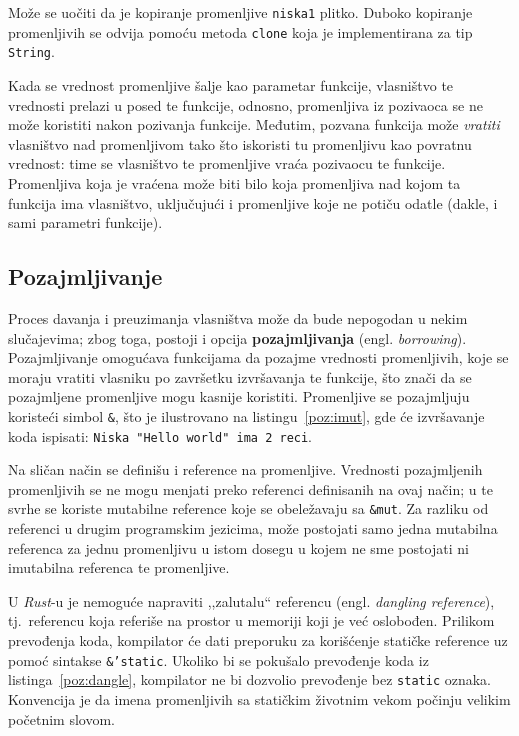 \documentclass[12pt,oneside]{memoir}
\begin{document}
Može se uočiti da je kopiranje promenljive \texttt{niska1} plitko. Duboko kopiranje promenljivih
se odvija pomoću metoda \texttt{clone} koja je implementirana za tip \texttt{String}.


Kada se vrednost promenljive šalje kao parametar funkcije, vlasništvo te vrednosti prelazi
u posed te funkcije, odnosno, promenljiva iz pozivaoca se ne može koristiti nakon pozivanja funkcije.
Međutim, pozvana funkcija može \emph{vratiti} vlasništvo nad promenljivom tako što iskoristi tu
promenljivu kao povratnu vrednost: time se vlasništvo te promenljive vraća pozivaocu te funkcije.
Promenljiva koja je vraćena može biti bilo koja promenljiva nad kojom ta funkcija ima vlasništvo,
uključujući i promenljive koje ne potiču odatle (dakle, i sami parametri funkcije).

\subsection{Pozajmljivanje}\label{subsec:pozajmljivanje}
Proces davanja i preuzimanja vlasništva može da bude nepogodan u nekim slučajevima; zbog toga,
postoji i opcija \textbf{pozajmljivanja} (engl. \emph{borrowing}). Pozajmljivanje omogućava
funkcijama da pozajme vrednosti promenljivih, koje se moraju vratiti vlasniku po završetku
izvršavanja te funkcije, što znači da se pozajmljene promenljive mogu kasnije koristiti.
Promenljive se pozajmljuju koristeći simbol \texttt{\&}, što je ilustrovano na
listingu~\ref{poz:imut}, gde će izvršavanje koda ispisati: \texttt{Niska "Hello world"
ima 2 reci}.



Na sličan način se definišu i reference na promenljive. Vrednosti pozajmljenih promenljivih se ne
mogu menjati preko referenci definisanih na ovaj način; u te svrhe
se koriste mutabilne reference koje se obeležavaju sa \texttt{\&mut}. Za razliku od referenci
u drugim programskim jezicima, može postojati samo jedna mutabilna referenca za jednu
promenljivu u istom dosegu u kojem ne sme postojati ni imutabilna referenca te promenljive.

U \emph{Rust}-u je nemoguće napraviti ,,zalutalu`` referencu (engl. \emph{dangling reference}),
tj.\ referencu koja referiše na prostor u memoriji koji je već oslobođen. Prilikom prevođenja
koda, kompilator će dati preporuku za korišćenje statičke reference uz pomoć sintakse
\texttt{\&'static}. Ukoliko bi se pokušalo prevođenje koda iz listinga~\ref{poz:dangle},
kompilator ne bi dozvolio prevođenje bez \texttt{static} oznaka. Konvencija je da imena
promenljivih sa statičkim životnim vekom počinju velikim početnim slovom.
\end{document}
